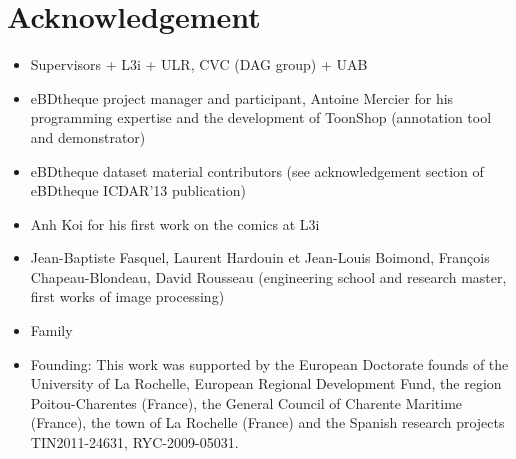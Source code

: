 \chapter*{Acknowledgement}
\begin{itemize}
	\item Supervisors + L3i + ULR, CVC (DAG group) + UAB
	\item eBDtheque project manager and participant, Antoine Mercier for his programming expertise and the development of ToonShop (annotation tool and demonstrator)
	\item eBDtheque dataset material contributors (see acknowledgement section of eBDtheque ICDAR'13 publication)
	\item Anh Koi for his first work on the comics at L3i
	\item Jean-Baptiste Fasquel, Laurent Hardouin et Jean-Louis Boimond, François Chapeau-Blondeau, David Rousseau (engineering school and research master, first works of image processing)
	\item Family
	\item Founding: This work was supported by the European Doctorate founds of the  University of La Rochelle, European Regional Development Fund, the region Poitou-Charentes (France), the General Council of Charente Maritime (France), the town of La Rochelle (France) and the Spanish research projects TIN2011-24631, RYC-2009-05031.
\end{itemize}
\clearpage\thispagestyle{empty}
